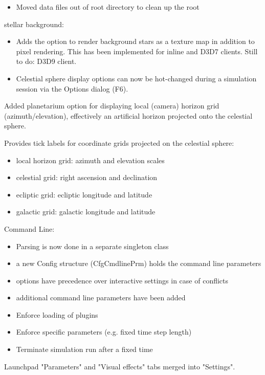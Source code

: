 \documentclass[Orbiter User Manual.tex]{subfiles}
\begin{document}
\begin{itemize}
\begin{sloppypar}
\begin{itemize}
		\item Moved data files out of root directory to clean up the root
	\end{itemize}
	\item stellar background:
	\begin{itemize}
		\item Adds the option to render background stars as a texture map in addition to pixel rendering. This has been implemented for inline and D3D7 clients. Still to do: D3D9 client.
		\item Celestial sphere display options can now be hot-changed during a simulation session via the Options dialog (F6).
	\end{itemize}
	\item Added planetarium option for displaying local (camera) horizon grid (azimuth/elevation), effectively an artificial horizon projected onto the celestial sphere.
	\item Provides tick labels for coordinate grids projected on the celestial sphere:
	\begin{itemize}
		\item local horizon grid: azimuth and elevation scales
		\item celestial grid: right ascension and declination
		\item ecliptic grid: ecliptic longitude and latitude
		\item galactic grid: galactic longitude and latitude
	\end{itemize}
	\item Command Line:
	\begin{itemize}
		\item Parsing is now done in a separate singleton class
		\item a new Config structure (CfgCmdlinePrm) holds the command line parameters
		\item options have precedence over interactive settings in case of conflicts
		\item additional command line parameters have been added
		\item Enforce loading of plugins
		\item Enforce specific parameters (e.g. fixed time step length)
		\item Terminate simulation run after a fixed time
	\end{itemize}
	\item Launchpad "Parameters" and "Visual effects" tabs merged into "Settings".
	\end{sloppypar}
\end{itemize}
\end{document}
